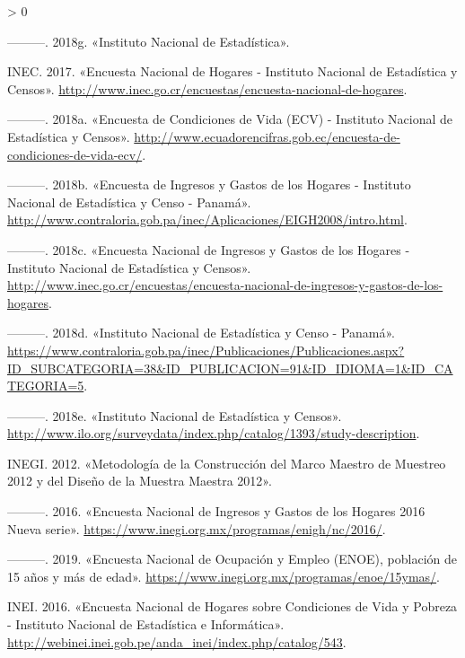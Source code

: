 \documentclass[
  12pt,
  spanish,
]{book}
\newlength{\cslhangindent}
\newenvironment{CSLReferences}[2] %
 {%
  \setlength{\parindent}{0pt}
  \ifodd #1 \everypar{\setlength{\hangindent}{\cslhangindent}}\ignorespaces\fi
  \ifnum #2 > 0
  \setlength{\parskip}{#2\baselineskip}
  \fi
 }%
 {}
\begin{document}
\begin{CSLReferences}{1}{0}
\leavevmode\hypertarget{ref-INE-HN}{}%
---------. 2018g. {«Instituto Nacional de Estadística»}.

\leavevmode\hypertarget{ref-INEC-CR_2017}{}%
INEC. 2017. {«Encuesta Nacional de Hogares - Instituto Nacional de Estadística y Censos»}. \url{http://www.inec.go.cr/encuestas/encuesta-nacional-de-hogares}.

\leavevmode\hypertarget{ref-INEC2-EC}{}%
---------. 2018a. {«Encuesta de Condiciones de Vida (ECV) - Instituto Nacional de Estadística y Censos»}. \url{http://www.ecuadorencifras.gob.ec/encuesta-de-condiciones-de-vida-ecv/}.

\leavevmode\hypertarget{ref-INEC2-PA}{}%
---------. 2018b. {«Encuesta de Ingresos y Gastos de los Hogares - Instituto Nacional de Estadística y Censo - Panamá»}. \url{http://www.contraloria.gob.pa/inec/Aplicaciones/EIGH2008/intro.html}.

\leavevmode\hypertarget{ref-INEC-CR_2018}{}%
---------. 2018c. {«Encuesta Nacional de Ingresos y Gastos de los Hogares - Instituto Nacional de Estadística y Censos»}. \url{http://www.inec.go.cr/encuestas/encuesta-nacional-de-ingresos-y-gastos-de-los-hogares}.

\leavevmode\hypertarget{ref-INEC-PA}{}%
---------. 2018d. {«Instituto Nacional de Estadística y Censo - Panamá»}. \url{https://www.contraloria.gob.pa/inec/Publicaciones/Publicaciones.aspx?ID_SUBCATEGORIA=38\&ID_PUBLICACION=91\&ID_IDIOMA=1\&ID_CATEGORIA=5}.

\leavevmode\hypertarget{ref-INEC-EC}{}%
---------. 2018e. {«Instituto Nacional de Estadística y Censos»}. \url{http://www.ilo.org/surveydata/index.php/catalog/1393/study-description}.

\leavevmode\hypertarget{ref-INEGI_MX_2012}{}%
INEGI. 2012. {«Metodología de la Construcción del Marco Maestro de Muestreo 2012 y del Diseño de la Muestra Maestra 2012»}.

\leavevmode\hypertarget{ref-INEGI2-MX}{}%
---------. 2016. {«Encuesta Nacional de Ingresos y Gastos de los Hogares 2016 Nueva serie»}. \url{https://www.inegi.org.mx/programas/enigh/nc/2016/}.

\leavevmode\hypertarget{ref-INEGI-MX}{}%
---------. 2019. {«Encuesta Nacional de Ocupación y Empleo (ENOE), población de 15 años y más de edad»}. \url{https://www.inegi.org.mx/programas/enoe/15ymas/}.

\leavevmode\hypertarget{ref-INEI-PE_2016}{}%
INEI. 2016. {«Encuesta Nacional de Hogares sobre Condiciones de Vida y Pobreza - Instituto Nacional de Estadística e Informática»}. \url{http://webinei.inei.gob.pe/anda_inei/index.php/catalog/543}.


\end{CSLReferences}
\end{document}
